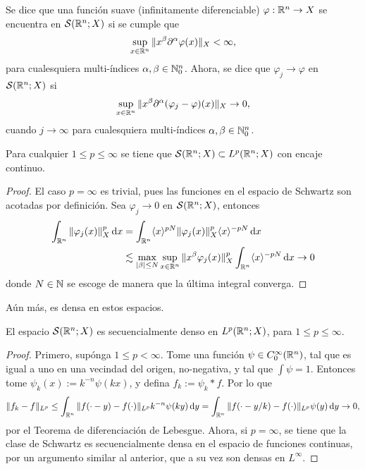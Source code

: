 \begin{definition}
    Se dice que una función suave (infinitamente diferenciable) 
    $\varphi:\mathbb{R}^n\rightarrow X$ se encuentra en $\mathcal{S}(\mathbb{R}^n;X)$ si se 
    cumple que
    \begin{equation*}
        \sup_{x\in\mathbb{R}^n}\|x^\beta \partial^\alpha \varphi(x)\|_X < \infty, 
    \end{equation*}
    para cualesquiera multi-índices $\alpha, \beta \in \mathbb{N}_0^n$. Ahora,
    se dice que $\varphi_j\rightarrow\varphi$ en $\mathcal{S}(\mathbb{R}^n;X)$ si
    \begin{equation*}
        \sup_{x\in\mathbb{R}^n}\|x^\beta \partial^\alpha (\varphi_j-
        \varphi)(x)\|_X \rightarrow 0, 
    \end{equation*}
    cuando $j\rightarrow\infty$ para cualesquiera multi-índices 
    $\alpha, \beta \in \mathbb{N}_0^n$.
\end{definition}
\begin{proposition}
    Para cualquier $1\leq p\leq\infty$ se tiene que 
    $\mathcal{S}(\mathbb{R}^n;X)\subset L^p(\mathbb{R}^n;X)$ con encaje continuo.
\end{proposition}
\begin{proof}
    El caso $p=\infty$ es trivial, pues las funciones en el espacio de Schwartz
    son acotadas por definición.
    Sea $\varphi_j\rightarrow0$ en $\mathcal{S}(\mathbb{R}^n;X)$, entonces
    \begin{align*}
        \int_{\mathbb{R}^n} \|\varphi_j(x)\|_X^p \mathop{}\!\mathrm{d} x & = 
        \int_{\mathbb{R}^n} \langle x\rangle^{pN} \|\varphi_j(x)\|_X^p \langle x\rangle^{-pN} \mathop{}\!\mathrm{d} x \\ 
        & \lesssim \max_{|\beta|\leq N} \sup_{x\in\mathbb{R}^n} 
        \|x^\beta\varphi_j(x)\|_X^p \int_{\mathbb{R}^n}\langle x\rangle^{-pN} \mathop{}\!\mathrm{d} x \to 0  
    \end{align*}
    donde $N\in\mathbb{N}$ se escoge de manera que la última integral converga. 
\end{proof}
Aún más, es densa en estos espacios.
\begin{theorem}
	El espacio $\mathcal{S}(\mathbb{R}^n;X)$ es secuencialmente denso en $L^p(\mathbb{R}^n;X)$, para $1\leq p\leq\infty$.
\end{theorem}
\begin{proof}
	Primero, supónga $1\leq p<\infty$. Tome una función $\psi\in C^\infty_0(\mathbb{R}^n)$, tal que es igual a uno en una vecindad del origen, no-negativa, y tal que $\int\psi = 1$. Entonces tome $\psi_k(x) := k^{-n}\psi(kx)$, y defina $f_k := \psi_k * f$. Por lo que 
	\begin{equation*}
		\|f_k - f\|_{L^p} \leq \int_{\mathbb{R}^n} \|f(\cdot - y) - f(\cdot)\|_{L^p}k^{-n}\psi(ky) \mathop{}\!\mathrm{d} y =  \int_{\mathbb{R}^n} \|f(\cdot - y/k) - f(\cdot)\|_{L^p}\psi(y)\mathop{}\!\mathrm{d} y \to 0,
	\end{equation*}
	por el Teorema de diferenciación de Lebesgue. Ahora, si $p=\infty$, se tiene que la clase de Schwartz es secuencialmente densa en el espacio de funciones continuas, por un argumento similar al anterior, que a su vez son densas en $L^\infty$.
\end{proof}
